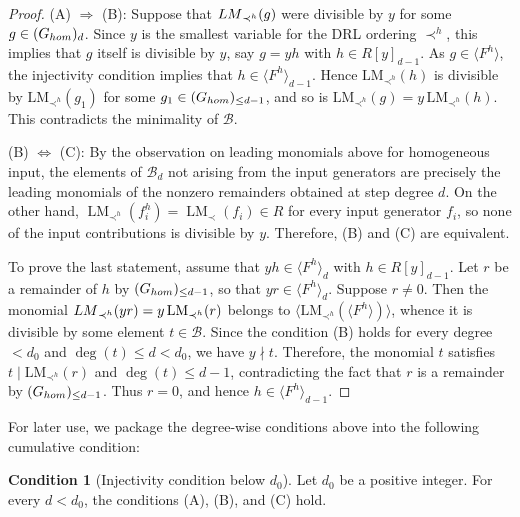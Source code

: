 \documentclass{article}
\theoremstyle{definition}
\newtheorem{condition}[theorem]{Condition}
\theoremstyle{plain}
\theoremstyle{plain}
\theoremstyle{plain}
\theoremstyle{plain}
\numberwithin{equation}{subsection}
\begin{document}
\begin{proof}
    (A) $\Longrightarrow$ (B): 
    Suppose that ${\rm LM}_{\prec^h}(g)$ were divisible by $y$ for some $g \in (G_{\rm hom})_{d}$.
    Since $y$ is the smallest variable for the DRL ordering $\prec^h$, this implies that $g$ itself is divisible by $y$, say $g=yh$ with $h\in R[y]_{d-1}$.
    As $g\in \langle F^h\rangle$, the injectivity condition implies that $h\in \langle F^h\rangle_{d-1}$.
    Hence $\mathrm{LM}_{\prec^h}(h)$ is divisible by $\mathrm{LM}_{\prec^h}(g_1)$ for some $g_1\in (G_{\rm hom})_{\leq d-1}$, and so is $\mathrm{LM}_{\prec^h}(g)=y\,\mathrm{LM}_{\prec^h}(h)$.
    This contradicts the minimality of $\mathcal{B}$.
    
    (B) $\Longleftrightarrow$ (C):
    By the observation on leading monomials above for homogeneous input, the elements of $\mathcal B_d$ not arising from the input generators are precisely the leading monomials of the nonzero remainders obtained at step degree $d$.
    On the other hand, $\operatorname{LM}_{\prec^h}(f_i^h) =\operatorname{LM}_{\prec}(f_i)\in R$ for every input generator $f_i$, so none of the input contributions is divisible by $y$.
    Therefore, {\rm (B)} and {\rm (C)} are equivalent.

    To prove the last statement, assume that $y h \in \langle F^h \rangle_d$ with $h \in R[y]_{d-1}$.
    Let $r$ be a remainder of $h$ by $(G_{\rm hom})_{\leq d-1}$, so that $y r \in \langle F^h \rangle_{d}$.
    Suppose $r\ne0$.
    Then the monomial ${\rm LM}_{\prec^h}(y r) = y\,\mathrm{LM}_{\prec^h}(r)$ belongs to $\langle \mathrm{LM}_{\prec^h}(\langle F^h\rangle)\rangle$, whence it is divisible by some element $t\in\mathcal B$.
    Since the condition {\rm (B)} holds for every degree $<d_0$ and $\deg(t)\le d < d_0$, we have $y\nmid t$.
    Therefore, the monomial $t$ satisfies $t\mid \mathrm{LM}_{\prec^h}(r)$ and $\deg(t)\leq d-1$, contradicting the fact that $r$ is a remainder by $(G_{\rm hom})_{\le d-1}$.
    Thus $r=0$, and hence $h\in\langle F^h\rangle_{d-1}$.    
\end{proof}

For later use, we package the degree-wise conditions above into the following cumulative condition:

\begin{condition}[Injectivity condition below $d_0$]\label{cond:inj}
Let $d_0$ be a positive integer.
For every $d < d_0$, the conditions {\rm (A)}, {\rm (B)}, and {\rm (C)} hold.
\end{condition}
\end{document}
